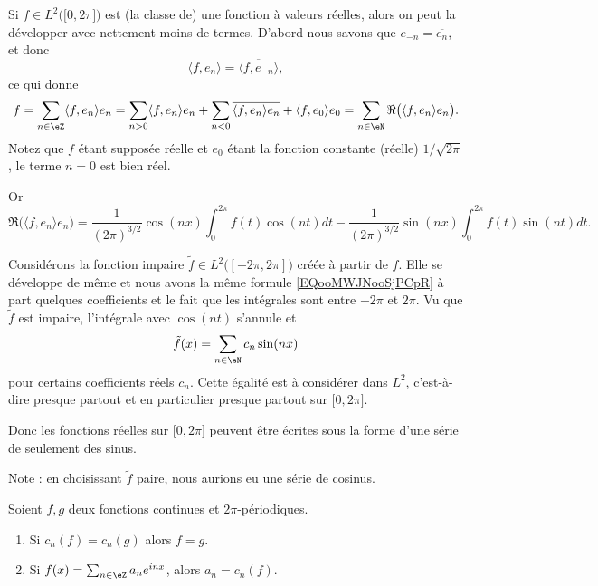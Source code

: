 \begin{example}     \label{EXooQDWUooLtuIOm}
	Si \( f\in L^2\big( \mathopen[ 0 , 2\pi \mathclose] \big)\) est (la classe de) une fonction à valeurs réelles, alors on peut la développer avec nettement moins de termes. D'abord nous savons que \( e_{-n}=\overline{ e_n }\), et donc
	\begin{equation}
		\langle f, e_n\rangle =\overline{ \langle f, e_{-n}\rangle  },
	\end{equation}
	ce qui donne
	\begin{equation}
		f=\sum_{n\in\eZ}\langle f, e_n\rangle e_n
		=\sum_{n>0}\langle f, e_n\rangle e_n +\sum_{n<0}\overline{ \langle f, e_n\rangle e_n }+\langle f, e_0 \rangle e_0
		=\sum_{n\in \eN}\Re\big( \langle f, e_n\rangle e_n \big).
	\end{equation}
	Notez que \( f\) étant supposée réelle et \( e_0\) étant la fonction constante (réelle) \( 1/\sqrt{ 2\pi }\), le terme \( n=0\) est bien réel.

	Or
	\begin{equation}        \label{EQooMWJNooSjPCpR}
		\Re\big( \langle f, e_n\rangle e_n \big)=\frac{1}{ (2\pi)^{3/2} }\cos(nx)\int_0^{2\pi}f(t)\cos(nt)dt-\frac{1}{ (2\pi)^{3/2} }\sin(nx)\int_0^{2\pi}f(t)\sin(nt)dt.
	\end{equation}

	Considérons la fonction impaire \( \tilde f\in L^2\big( [-2\pi,2\pi] \big)\) créée à partir de \( f\). Elle se développe de même et nous avons la même formule \eqref{EQooMWJNooSjPCpR} à part quelques coefficients et le fait que les intégrales sont entre \( -2\pi\) et \( 2\pi\). Vu que \( \tilde f\) est impaire, l'intégrale avec \( \cos(nt)\) s'annule et
	\begin{equation}
		\tilde f(x)=\sum_{n\in \eN}c_n\sin(nx)
	\end{equation}
	pour certains coefficients réels \( c_n\). Cette égalité est à considérer dans \( L^2\), c'est-à-dire presque partout et en particulier presque partout sur \( \mathopen[ 0 , 2\pi \mathclose]\).

	Donc les fonctions réelles sur \( \mathopen[ 0 , 2\pi \mathclose]\) peuvent être écrites sous la forme d'une série de seulement des sinus.

	Note : en choisissant \( \tilde f\) paire, nous aurions eu une série de cosinus.
\end{example}




\begin{corollary}   \label{CordgtXlC}
	Soient \( f,g\) deux fonctions continues et \( 2\pi\)-périodiques.
	\begin{enumerate}
		\item       \label{ITEMooPLTIooSDykYF}
		      Si \( c_n(f)=c_n(g)\) alors \( f=g\).
		\item       \label{ITEMooQMMSooEpIFbt}
		      Si \( f(x)=\sum_{n\in \eZ}a_n e^{inx}\), alors \( a_n=c_n(f)\).
	\end{enumerate}
\end{corollary}

